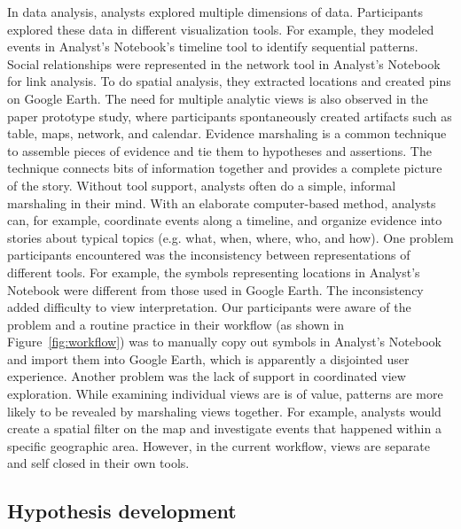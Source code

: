 In data analysis, analysts explored multiple dimensions of data. Participants explored these data in different visualization tools. For example, they modeled events in Analyst’s Notebook’s timeline tool to identify sequential patterns. Social relationships were represented in the network tool in Analyst’s Notebook for link analysis. To do spatial analysis, they extracted locations and created pins on Google Earth. The need for multiple analytic views is also observed in the paper prototype study, where participants spontaneously created artifacts such as table, maps, network, and calendar.
Evidence marshaling is a common technique to assemble pieces of evidence and tie them to hypotheses and assertions. The technique connects bits of information together and provides a complete picture of the story. Without tool support, analysts often do a simple, informal marshaling in their mind. With an elaborate computer-based method, analysts can, for example, coordinate events along a timeline, and organize evidence into stories about typical topics (e.g. what, when, where, who, and how).
One problem participants encountered was the inconsistency between representations of different tools. For example, the symbols representing locations in Analyst’s Notebook were different from those used in Google Earth. The inconsistency added difficulty to view interpretation. Our participants were aware of the problem and a routine practice in their workflow (as shown in Figure~\ref{fig:workflow}) was to manually copy out symbols in Analyst’s Notebook and import them into Google Earth, which is apparently a disjointed user experience. Another problem was the lack of support in coordinated view exploration. While examining individual views are is of value, patterns are more likely to be revealed by marshaling views together. For example, analysts would create a spatial filter on the map and investigate events that happened within a specific geographic area. However, in the current workflow, views are separate and self closed in their own tools.

\subsection{Hypothesis development}

